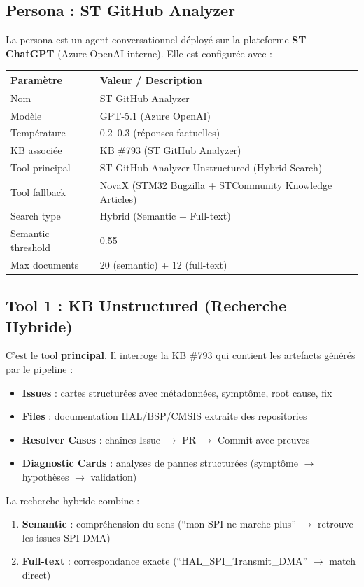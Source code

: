 \documentclass[12pt,a4paper]{report}
\begin{document}
\subsection{Persona : ST GitHub Analyzer}

La persona est un agent conversationnel déployé sur la plateforme \textbf{ST ChatGPT} (Azure OpenAI interne). Elle est configurée avec :

\begin{longtable}{p{4.5cm}p{8.5cm}}
\toprule
\textbf{Paramètre} & \textbf{Valeur / Description} \\
\midrule
Nom & ST GitHub Analyzer \\
Modèle & GPT-5.1 (Azure OpenAI) \\
Température & 0.2--0.3 (réponses factuelles) \\
KB associée & KB \#793 (ST GitHub Analyzer) \\
Tool principal & ST-GitHub-Analyzer-Unstructured (Hybrid Search) \\
Tool fallback & NovaX (STM32 Bugzilla + STCommunity Knowledge Articles) \\
Search type & Hybrid (Semantic + Full-text) \\
Semantic threshold & 0.55 \\
Max documents & 20 (semantic) + 12 (full-text) \\
\bottomrule
\end{longtable}

\subsection{Tool 1 : KB Unstructured (Recherche Hybride)}

C'est le tool \textbf{principal}. Il interroge la KB \#793 qui contient les artefacts générés par le pipeline :

\begin{itemize}
  \item \textbf{Issues} : cartes structurées avec métadonnées, symptôme, root cause, fix
  \item \textbf{Files} : documentation HAL/BSP/CMSIS extraite des repositories
  \item \textbf{Resolver Cases} : chaînes Issue $\to$ PR $\to$ Commit avec preuves
  \item \textbf{Diagnostic Cards} : analyses de pannes structurées (symptôme $\to$ hypothèses $\to$ validation)
\end{itemize}

La recherche hybride combine :
\begin{enumerate}
  \item \textbf{Semantic} : compréhension du sens (``mon SPI ne marche plus'' $\to$ retrouve les issues SPI DMA)
  \item \textbf{Full-text} : correspondance exacte (``HAL\_SPI\_Transmit\_DMA'' $\to$ match direct)
\end{enumerate}
\end{document}
